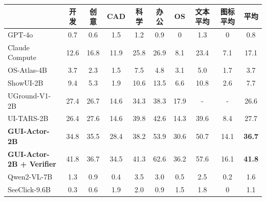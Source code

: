 \begin{table}[!t]
{\begin{tabular}{lccccccccc}
\toprule
& \textbf{开发} & \textbf{创意} & \textbf{CAD} & \textbf{科学} & \textbf{办公} & \textbf{OS} & \textbf{文本平均} & \textbf{图标平均} & \cellcolor{lightblue}\textbf{平均} \\
\midrule
GPT-4o & 0.7 & 0.6 & 1.5 & 1.2 & 0.9 & 0 & 1.3 & 0 & \cellcolor{lightblue}0.8 \\
Claude Compute & 12.6 & 16.8 & 11.9 & 25.8 & 26.9 & 8.1 & 23.4 & 7.1 & \cellcolor{lightblue}17.1 \\
\midrule
OS-Atlas-4B & 3.7 & 2.3 & 1.5 & 7.5 & 4.8 & 3.1 & 5.0 & 1.7 & \cellcolor{lightblue}3.7 \\
ShowUI-2B & 9.4 & 5.3 & 1.9 & 10.6 & 13.5 & 6.6 & 10.8 & 2.6 & \cellcolor{lightblue}7.7 \\
UGround-V1-2B & 27.4 & 26.7 & 14.6 & 34.3 & 38.3 & 17.9 & - & - & \cellcolor{lightblue}26.6 \\
UI-TARS-2B & 26.4 & 27.6 & 14.6 & 39.8 & 42.6 & 14.3 & 39.6 & 8.4 & \cellcolor{lightblue}27.7 \\
\cellcolor{lightblue}\textbf{GUI-Actor-2B} & \cellcolor{lightblue}34.8 & \cellcolor{lightblue}35.5 & \cellcolor{lightblue}28.4 & \cellcolor{lightblue}38.2 & \cellcolor{lightblue}53.9 & \cellcolor{lightblue}30.6 & \cellcolor{lightblue}50.7 & \cellcolor{lightblue}14.1 & \cellcolor{lightblue}\textbf{36.7}\\
\cellcolor{lightblue}\textbf{GUI-Actor-2B + Verifier} &  \cellcolor{lightblue}41.8 & \cellcolor{lightblue}36.7 & \cellcolor{lightblue}34.5 & \cellcolor{lightblue}41.3 & \cellcolor{lightblue}62.6 & \cellcolor{lightblue}36.2 & \cellcolor{lightblue}57.6 & \cellcolor{lightblue}16.1 & \cellcolor{lightblue}\textbf{41.8} \\
\midrule
Qwen2-VL-7B & 1.3 & 0.9 & 0.4 & 3.5 & 3.0 & 0.5 & 2.5 & 0.2 & \cellcolor{lightblue}1.6 \\
SeeClick-9.6B & 0.3 & 0.6 & 1.9 & 2.0 & 0.9 & 1.5 & 1.8 & 0 & \cellcolor{lightblue}1.1 \\

\end{tabular}}
\end{table}
